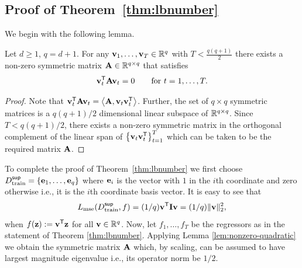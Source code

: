 \subsection{Proof of Theorem~\ref{thm:lbnumber}} \label{sec:lbnumber-proof}
We begin with the following lemma.
\begin{lemma}\label{lem:nonzero-quadratic}
Let $d\ge 1$, $q = d+1$. For any ${\mathbf{v}}_1,\dots,{\mathbf{v}}_T\in\mathbb{R}^q$ with $T< \frac{q(q+1)}{2}$ there exists a non-zero symmetric matrix ${\mathbf{A}}\in\mathbb{R}^{q\times q}$ that satisfies \begin{equation}\label{eq:constraints-lbnumber}
{\mathbf{v}}_t^{\sf T}{\mathbf{A}} {\mathbf{v}}_t = 0\qquad\text{for }t=1,\dots,T.
\end{equation}

\end{lemma}
\begin{proof}
Note that ${\mathbf{v}}_t^{\sf T}{\mathbf{A}} {\mathbf{v}}_t = \left\langle {\mathbf{A}}, {\mathbf{v}}_t{\mathbf{v}}_t^{\sf T}\right\rangle$. Further, the set of $q\times q$ symmetric matrices is a $q(q+1)/2$ dimensional linear subspace of $\mathbb{R}^{q\times q}$. Since $T < q(q+1)/2$, there exists a non-zero symmetric matrix  in the orthogonal complement of the linear span of $\left\{{\mathbf{v}}_t{\mathbf{v}}_t^{\sf T} \right\}_{t=1}^T$ which can be taken to be the required matrix ${\mathbf{A}}$. \end{proof}

To complete the proof of Theorem~\ref{thm:lbnumber} we first choose $D^{\sf sup}_{\textnormal{train}} = \{\mathbf{e}_1, \dots, \mathbf{e}_q\}$ where $\mathbf{e}_i$ is the vector with $1$ in the $i$th coordinate and zero otherwise i.e., it is the $i$th coordinate basis vector. It is easy to see that 
\begin{equation}\label{eqn:lbnumber-1}
L_{\textnormal{mse}}(D^{\sf sup}_{\textnormal{train}}, f) = (1/q){\mathbf{v}}^{\sf T}\mathbf{I}{\mathbf{v}} = (1/q) \|{\mathbf{v}}\|_2^2,
\end{equation}
when $f({\mathbf{z}}) := {\mathbf{v}}^{\sf T}{\mathbf{z}}$ for all ${\mathbf{v}} \in \mathbb{R}^q$. 
Now, let $f_1, \dots, f_T$ be the regressors as in the statement of Theorem \ref{thm:lbnumber}. Applying Lemma \ref{lem:nonzero-quadratic} we obtain the symmetric matrix ${\mathbf{A}}$ which, by scaling, can be assumed to have largest magnitude eigenvalue i.e., its operator norm be $1/2$.

